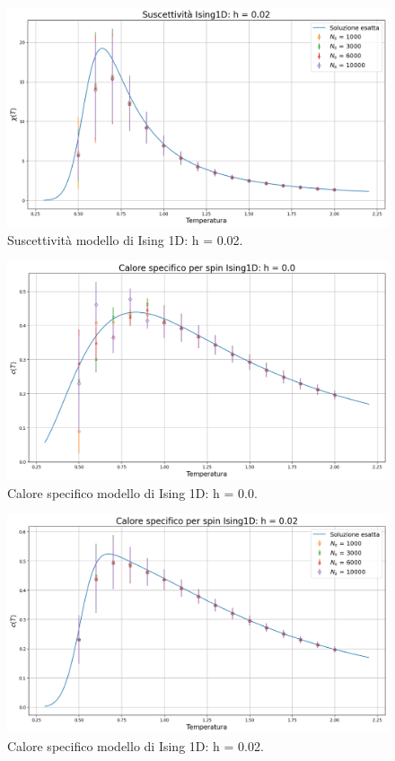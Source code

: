 \begin{figure}[H]
    \centering
    \includegraphics[width=\textwidth]{Immagini/simIsing1D/chi_h0.02.png}
    \caption{Suscettività modello di Ising 1D: h = 0.02.}
    \label{fig: chi_Ising1D_h0.0}
\end{figure}

\begin{figure}[H]
    \centering
    \includegraphics[width=\textwidth]{Immagini/simIsing1D/cp_h0.0.png}
    \caption{Calore specifico modello di Ising 1D: h = 0.0.}
    \label{fig: cp_Ising1D_h0.0}
\end{figure}

\begin{figure}[H]
    \centering
    \includegraphics[width=\textwidth]{Immagini/simIsing1D/cp_h0.02.png}
    \caption{Calore specifico modello di Ising 1D: h = 0.02.}
    \label{fig: cp_Ising1D_h0.0}
\end{figure}